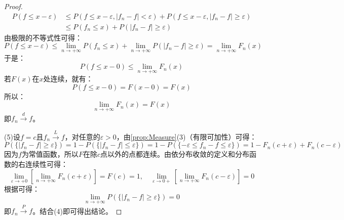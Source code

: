 \begin{proof}
	\begin{align*}
		P(f\leqslant x-\varepsilon)&\leqslant P(f\leqslant x-\varepsilon,|f_n-f|<\varepsilon)+P(f\leqslant x-\varepsilon,|f_n-f|\geqslant \varepsilon) \\
		&\leqslant P(f_n\leqslant x)+P(|f_n-f|\geqslant\varepsilon)
	\end{align*}
	由极限的不等式性可得：
	\begin{equation*}
		P(f\leqslant x-\varepsilon)\leqslant\lim_{n\to+\infty}P(f_n\leqslant x)+\lim_{n\to+\infty}P(|f_n-f|\geqslant\varepsilon)=\lim_{n\to+\infty}F_n(x)
	\end{equation*}
	于是：
	\begin{equation*}
		P(f\leqslant x-0)\leqslant\lim_{n\to+\infty}F_n(x)
	\end{equation*}
	若$F(x)$在$x$处连续，就有：
	\begin{equation*}
		P(f\leqslant x-0)=F(x-0)=F(x)
	\end{equation*}
	所以：
	\begin{equation}
		\lim_{n\to+\infty}F_n(x)=F(x)
	\end{equation}
	即$f_n\overset{d}{\longrightarrow}f$。\par
	(5)设$f=c$且$f_n\overset{L}{\longrightarrow}f$，对任意的$\varepsilon>0$，由\cref{prop:Measure}(3)（有限可加性）可得：
	\begin{equation*}
		P(\{|f_n-f|\geqslant\varepsilon\})=1-P(\{|f_n-f|\leqslant\varepsilon\})=1-P(\{-\varepsilon\leqslant f_n-f\leqslant\varepsilon\})=1-F_n(c+\varepsilon)+F_n(c-\varepsilon)
	\end{equation*}
	因为$f$为常值函数，所以$F$在除$c$点以外的点都连续。由依分布收敛的定义和分布函数的右连续性可得：
	\begin{equation*}
		\lim_{\varepsilon\to+0}\left[\lim_{n\to+\infty}F_n(c+\varepsilon)\right]=F(c)=1,\quad\lim_{\varepsilon\to0+}\left[\lim_{n\to+\infty}F_n(c-\varepsilon)\right]=0
	\end{equation*}
	根据可得：
	\begin{equation*}
		\lim_{n\to+\infty}P(\{|f_n-f|\geqslant\varepsilon\})=0
	\end{equation*}
	即$f_n\overset{P}{\longrightarrow}f$。结合(4)即可得出结论。
\end{proof}
